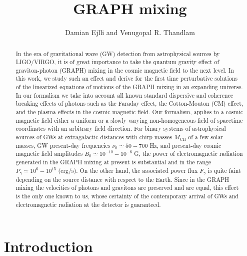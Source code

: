 \documentclass[a4paper,11pt]{article}
\begin{document}
\title{\bf{GRAPH mixing}}
\author{Damian Ejlli and Venugopal R. Thandlam}


\date{}


\maketitle


\begin{abstract}

In the era of gravitational wave (GW) detection from astrophysical sources by LIGO/VIRGO, it is of great importance to take the quantum gravity effect of graviton-photon (GRAPH) mixing in the cosmic magnetic field to the next level. In this work, we study such an effect and derive for the first time perturbative solutions of the linearized equations of motions of the GRAPH mixing in an expanding universe. In our formalism we take into account all known standard dispersive and coherence breaking effects of photons such as the Faraday effect, the Cotton-Mouton (CM) effect, and the plasma effects in the cosmic magnetic field. Our formalism, applies to a cosmic magnetic field either a uniform or a slowly varying non-homogeneous field of spacetime coordinates with an arbitrary field direction. For binary systems of astrophysical sources of GWs at extragalactic distances with chirp masses $M_\text{CH}$ of a few solar masses, GW present-day frequencies $\nu_0\simeq 50-700$ Hz, and present-day cosmic magnetic field amplitudes $\bar B_0\simeq 10^{-10}-10^{-6}$ G, the power of electromagnetic radiation generated in the GRAPH mixing at present is substantial and in the range $P_\gamma\simeq 10^6-10^{15}$ (erg/s). On the other hand, the associated power flux $F_\gamma$ is quite faint depending on the source distance with respect to the Earth. Since in the GRAPH mixing the velocities of photons and gravitons are preserved and are equal, this effect is the only one known to us, whose certainty of the contemporary arrival of GWs and electromagnetic radiation at the detector is guaranteed.  


\end{abstract}


\vspace{1cm}


\section{Introduction}
\label{sec:1}
\end{document}
